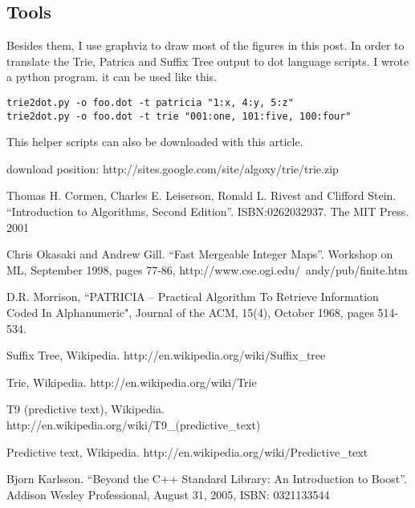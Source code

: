 \documentclass{article}
\begin{document}
\subsection{Tools}

Besides them, I use graphviz to draw most of the figures in this post. In order to
translate the Trie, Patrica and Suffix Tree output to dot language scripts. I wrote a python program.
it can be used like this.

\begin{verbatim}
trie2dot.py -o foo.dot -t patricia "1:x, 4:y, 5:z"
trie2dot.py -o foo.dot -t trie "001:one, 101:five, 100:four"
\end{verbatim}

This helper scripts can also be downloaded with this article.

download position: http://sites.google.com/site/algoxy/trie/trie.zip

\begin{thebibliography}{99}

Thomas H. Cormen, Charles E. Leiserson, Ronald L. Rivest and Clifford Stein. 
``Introduction to Algorithms, Second Edition''. ISBN:0262032937. The MIT Press. 2001

Chris Okasaki and Andrew Gill. ``Fast Mergeable Integer
Maps''. Workshop on ML, September 1998, pages 77-86, http://www.cse.ogi.edu/~andy/pub/finite.htm

D.R. Morrison, ``PATRICIA -- Practical Algorithm To Retrieve  Information Coded In Alphanumeric", Journal of the ACM, 15(4), October 1968, pages 514-534.

Suffix Tree, Wikipedia. http://en.wikipedia.org/wiki/Suffix\_tree

Trie, Wikipedia. http://en.wikipedia.org/wiki/Trie

T9 (predictive text), Wikipedia. http://en.wikipedia.org/wiki/T9\_(predictive\_text)

Predictive text,
Wikipedia. http://en.wikipedia.org/wiki/Predictive\_text

Bjorn Karlsson. ``Beyond the C++ Standard Library: An Introduction to
Boost''. Addison Wesley Professional, August 31, 2005, ISBN: 0321133544

\end{thebibliography}

\ifx\wholebook\relax\else
\end{document}
